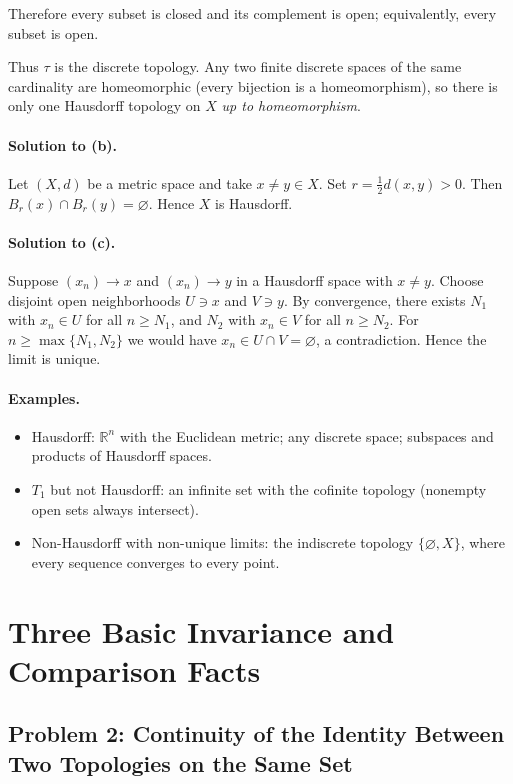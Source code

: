 \documentclass[12pt,a4paper]{article}
\theoremstyle{plain}
\theoremstyle{definition}
\theoremstyle{remark}
\theoremstyle{remark}
\begin{document}
	Therefore every subset is closed and its complement is open; equivalently, every subset is open.
	
	Thus $\tau$ is the discrete topology. Any two finite discrete spaces of the same cardinality are
	homeomorphic (every bijection is a homeomorphism), so there is only one Hausdorff topology on $X$
	\emph{up to homeomorphism}.
	
	\paragraph{Solution to (b).}
	Let $(X,d)$ be a metric space and take $x\neq y\in X$. Set $r=\tfrac12 d(x,y)>0$.
	Then $B_r(x)\cap B_r(y)=\varnothing$. Hence $X$ is Hausdorff.
	
	\paragraph{Solution to (c).}
	Suppose $(x_n)\to x$ and $(x_n)\to y$ in a Hausdorff space with $x\neq y$.
	Choose disjoint open neighborhoods $U\ni x$ and $V\ni y$.
	By convergence, there exists $N_1$ with $x_n\in U$ for all $n\ge N_1$, and $N_2$ with $x_n\in V$ for all $n\ge N_2$.
	For $n\ge \max\{N_1,N_2\}$ we would have $x_n\in U\cap V=\varnothing$, a contradiction.
	Hence the limit is unique.
	
	\paragraph{Examples.}
	\begin{itemize}
		\item Hausdorff: $\mathbb{R}^n$ with the Euclidean metric; any discrete space; subspaces and products of Hausdorff spaces.
		\item $T_1$ but not Hausdorff: an infinite set with the cofinite topology (nonempty open sets always intersect).
		\item Non-Hausdorff with non-unique limits: the indiscrete topology $\{\varnothing,X\}$, where every sequence converges to every point.
	\end{itemize}
	
\section*{Three Basic Invariance and Comparison Facts}

\subsection*{Problem 2: Continuity of the Identity Between Two Topologies on the Same Set}
\end{document}
